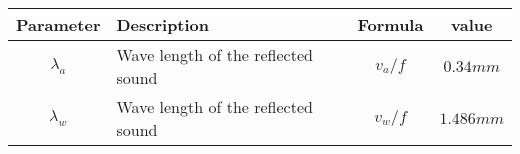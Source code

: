 \begin{tabular}{|c|p{2cm}|c|c|}
\hline 
\textbf{Parameter}  &\textbf{Description} &\textbf{Formula} &\textbf{value} \\
\hline
$\lambda_a$ & Wave length of the reflected sound & $v_a/f$& $0.34mm$  \\
\hline
$\lambda_w$ &  Wave length of the reflected sound & $v_w/f$ &$1.486mm$ \\
\hline
\end{tabular}
